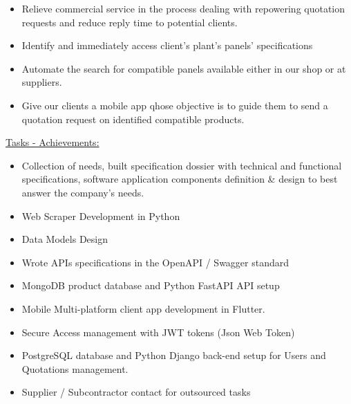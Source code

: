 \documentclass[]{friggeri-cv}
\begin{document}
\begin{itemize}
\setlength{\itemsep}{1pt}
\setlength{\parskip}{0pt}
\setlength{\parsep}{0pt}

\item Relieve commercial service in the process dealing with repowering quotation requests and reduce reply time to potential clients.
\item Identify and immediately access client's plant's panels' specifications
\item Automate the search for compatible panels available either in our shop or at suppliers.
\item Give our clients a mobile app qhose objective is to guide them to send a quotation request on identified compatible products.
\end{itemize}

\vspace{1.5mm}
\underline{Tasks - Achievements: }\\

\begin{itemize}
\setlength{\itemsep}{1pt}
\setlength{\parskip}{0pt}
\setlength{\parsep}{0pt}

\item Collection of needs, built specification dossier with technical and functional specifications, software application components definition \& design to best answer the company's needs.
\item Web Scraper Development in Python
\item Data Models Design
\item Wrote APIs specifications in the OpenAPI / Swagger standard
\item MongoDB product database and Python FastAPI API setup
\item Mobile Multi-platform client app development in Flutter.
\item Secure Access management with JWT tokens (Json Web Token)
\item PostgreSQL database and Python Django back-end setup for Users and Quotations management.
\item Supplier / Subcontractor contact for outsourced tasks
\end{itemize}
\end{document}

